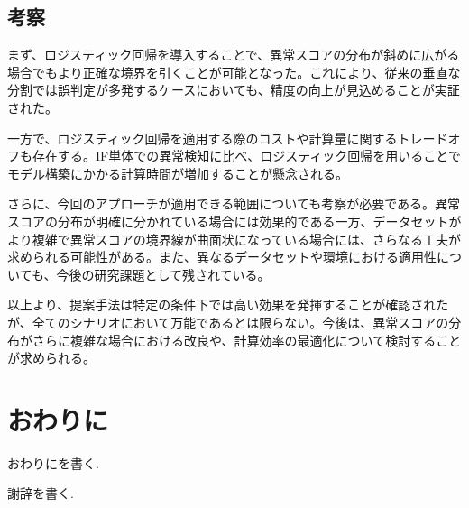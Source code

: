 \documentclass{css}
\begin{document}
\subsection{考察}

まず、ロジスティック回帰を導入することで、異常スコアの分布が斜めに広がる場合でもより正確な境界を引くことが可能となった。これにより、従来の垂直な分割では誤判定が多発するケースにおいても、精度の向上が見込めることが実証された。

一方で、ロジスティック回帰を適用する際のコストや計算量に関するトレードオフも存在する。IF単体での異常検知に比べ、ロジスティック回帰を用いることでモデル構築にかかる計算時間が増加することが懸念される。

さらに、今回のアプローチが適用できる範囲についても考察が必要である。異常スコアの分布が明確に分かれている場合には効果的である一方、データセットがより複雑で異常スコアの境界線が曲面状になっている場合には、さらなる工夫が求められる可能性がある。また、異なるデータセットや環境における適用性についても、今後の研究課題として残されている。

以上より、提案手法は特定の条件下では高い効果を発揮することが確認されたが、全てのシナリオにおいて万能であるとは限らない。今後は、異常スコアの分布がさらに複雑な場合における改良や、計算効率の最適化について検討することが求められる。

\section{おわりに}
おわりにを書く.

\begin{acknowledgment}
謝辞を書く.
\end{acknowledgment}

\begin{thebibliography}{10}

\end{thebibliography}
\end{document}
